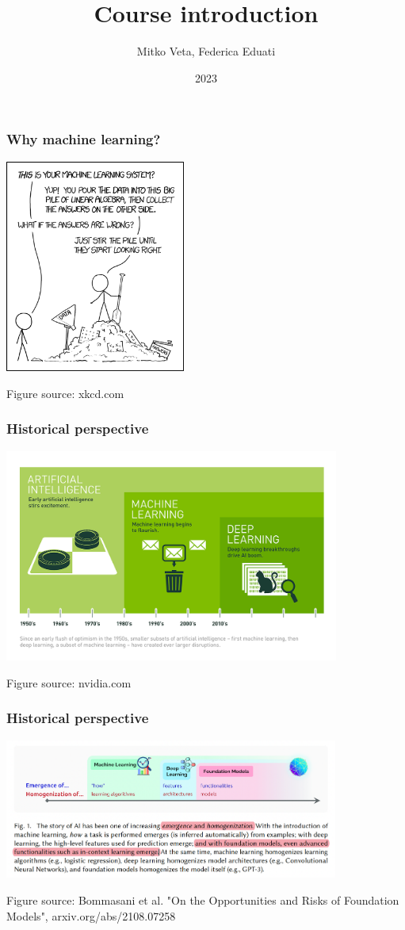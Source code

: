 \documentclass[notes]{beamer}          %
\title{Course introduction}
\author{Mitko Veta, Federica Eduati}
\institute{Eindhoven University of Technology

Department of Biomedical Engineering}
\date{2023}
\begin{document}
 
\frame{\titlepage}

\begin{frame}
\frametitle{Why machine learning?}
\begin{center}
\includegraphics[height=7cm]{../figures/intro/machine_learning.png}
\end{center}
{\tiny Figure source: xkcd.com}
\end{frame}

\begin{frame}
\frametitle{Historical perspective}
\begin{center}
\includegraphics[height=7cm]{../figures/intro/deep_learning.png}
\end{center}
{\tiny Figure source: nvidia.com}
\end{frame}

\begin{frame}
\frametitle{Historical perspective}
\begin{center}
\includegraphics[height=4.6cm]{../figures/intro/foundation_models.png}
\end{center}
{\tiny Figure source: Bommasani et al. "On the Opportunities and Risks of Foundation Models", arxiv.org/abs/2108.07258

}
\end{frame}
\end{document}
